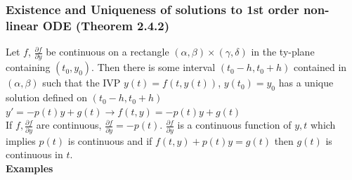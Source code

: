 \documentclass{article}
\begin{document}
\subsubsection{Existence and Uniqueness of solutions to 1st order non-linear ODE (Theorem 2.4.2)}
Let $f$, $\frac{\partial f}{\partial y}$ be continuous on a rectangle $(\alpha,\beta)\times(\gamma,\delta)$ in the ty-plane containing $(t_0,y_0)$. Then there is some interval $(t_0-h,t_0+h)$ contained in $(\alpha,\beta)$ such that the IVP $y(t)=f(t,y(t))$, $y(t_0)=y_0$ has a unique solution defined on $(t_0-h,t_0+h)$\\
$y'=-p(t)y+g(t)\rightarrow f(t,y)=-p(t)y+g(t)$\\
If $f,\frac{\partial f}{\partial y}$ are continuous, $\frac{\partial f}{\partial y}=-p(t)$. $\frac{\partial f}{\partial y}$ is a continuous function of $y,t$ which implies $p(t)$ is continuous and if $f(t,y)+p(t)y=g(t)$ then $g(t)$ is continuous in $t$.\\ 
\textbf{Examples}
\end{document}
